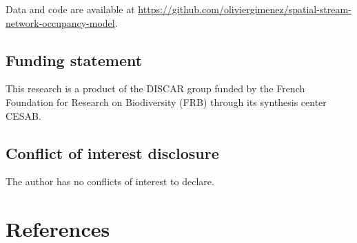 \documentclass[
  11pt,
  a4paper,
]{article}
\begin{document}
Data and code are available at \href{https://github.com/oliviergimenez/spatial-stream-network-occupancy-model}{https://github.com/oliviergimenez/spatial-stream-network-occupancy-model}.

\subsection{Funding statement}\label{funding-statement}

This research is a product of the DISCAR group funded by the French Foundation for Research on Biodiversity (FRB) through its synthesis center CESAB.

\subsection{Conflict of interest disclosure}\label{conflict-of-interest-disclosure}

The author has no conflicts of interest to declare.

\section{References}\label{references}
\end{document}
